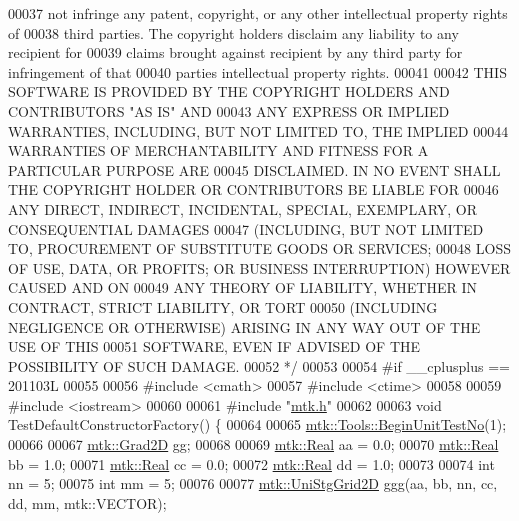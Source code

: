 \begin{DoxyCode}
00037 \textcolor{comment}{not infringe any patent, copyright, or any other intellectual property rights of}
00038 \textcolor{comment}{third parties. The copyright holders disclaim any liability to any recipient for}
00039 \textcolor{comment}{claims brought against recipient by any third party for infringement of that}
00040 \textcolor{comment}{parties intellectual property rights.}
00041 \textcolor{comment}{}
00042 \textcolor{comment}{THIS SOFTWARE IS PROVIDED BY THE COPYRIGHT HOLDERS AND CONTRIBUTORS "AS IS" AND}
00043 \textcolor{comment}{ANY EXPRESS OR IMPLIED WARRANTIES, INCLUDING, BUT NOT LIMITED TO, THE IMPLIED}
00044 \textcolor{comment}{WARRANTIES OF MERCHANTABILITY AND FITNESS FOR A PARTICULAR PURPOSE ARE}
00045 \textcolor{comment}{DISCLAIMED. IN NO EVENT SHALL THE COPYRIGHT HOLDER OR CONTRIBUTORS BE LIABLE FOR}
00046 \textcolor{comment}{ANY DIRECT, INDIRECT, INCIDENTAL, SPECIAL, EXEMPLARY, OR CONSEQUENTIAL DAMAGES}
00047 \textcolor{comment}{(INCLUDING, BUT NOT LIMITED TO, PROCUREMENT OF SUBSTITUTE GOODS OR SERVICES;}
00048 \textcolor{comment}{LOSS OF USE, DATA, OR PROFITS; OR BUSINESS INTERRUPTION) HOWEVER CAUSED AND ON}
00049 \textcolor{comment}{ANY THEORY OF LIABILITY, WHETHER IN CONTRACT, STRICT LIABILITY, OR TORT}
00050 \textcolor{comment}{(INCLUDING NEGLIGENCE OR OTHERWISE) ARISING IN ANY WAY OUT OF THE USE OF THIS}
00051 \textcolor{comment}{SOFTWARE, EVEN IF ADVISED OF THE POSSIBILITY OF SUCH DAMAGE.}
00052 \textcolor{comment}{*/}
00053 
00054 \textcolor{preprocessor}{#if \_\_cplusplus == 201103L}
00055 
00056 \textcolor{preprocessor}{#include <cmath>}
00057 \textcolor{preprocessor}{#include <ctime>}
00058 
00059 \textcolor{preprocessor}{#include <iostream>}
00060 
00061 \textcolor{preprocessor}{#include "\hyperlink{mtk_8h}{mtk.h}"}
00062 
00063 \textcolor{keywordtype}{void} TestDefaultConstructorFactory() \{
00064 
00065   \hyperlink{classmtk_1_1Tools_afc29ecaf337a13ed2e817d3890a5a441}{mtk::Tools::BeginUnitTestNo}(1);
00066 
00067   \hyperlink{classmtk_1_1Grad2D}{mtk::Grad2D} gg;
00068 
00069   \hyperlink{group__c01-roots_gac080bbbf5cbb5502c9f00405f894857d}{mtk::Real} aa = 0.0;
00070   \hyperlink{group__c01-roots_gac080bbbf5cbb5502c9f00405f894857d}{mtk::Real} bb = 1.0;
00071   \hyperlink{group__c01-roots_gac080bbbf5cbb5502c9f00405f894857d}{mtk::Real} cc = 0.0;
00072   \hyperlink{group__c01-roots_gac080bbbf5cbb5502c9f00405f894857d}{mtk::Real} dd = 1.0;
00073 
00074   \textcolor{keywordtype}{int} nn = 5;
00075   \textcolor{keywordtype}{int} mm = 5;
00076 
00077   \hyperlink{classmtk_1_1UniStgGrid2D}{mtk::UniStgGrid2D} ggg(aa, bb, nn, cc, dd, mm, mtk::VECTOR);

\end{DoxyCode}
